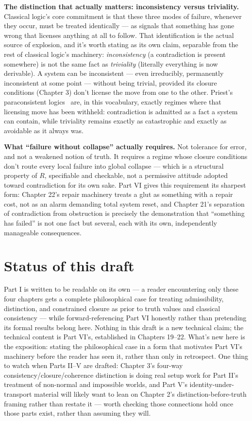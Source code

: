 \textbf{The distinction that actually matters: inconsistency versus
triviality.} Classical logic's core commitment is that these three modes
of failure, whenever they occur, must be treated identically --- as
signals that something has gone wrong that licenses anything at all to
follow. That identification is the actual source of explosion, and it's
worth stating as its own claim, separable from the rest of classical
logic's machinery: \emph{inconsistency} (a contradiction is present somewhere)
is not the same fact as \emph{triviality} (literally everything is now
derivable). A system can be inconsistent --- even irreducibly, permanently
inconsistent at some point --- without being trivial, provided its closure
conditions (Chapter 3) don't license the move from one to the other.
Priest's paraconsistent logics~\cite{priest2006} are, in this vocabulary, exactly regimes
where that licensing move has been withheld: contradiction is admitted as
a fact a system can contain, while triviality remains exactly as
catastrophic and exactly as avoidable as it always was.

\textbf{What ``failure without collapse'' actually requires.} Not tolerance for
error, and not a weakened notion of truth. It requires a regime whose
closure conditions don't route every local failure into global
collapse --- which is a structural property of \(R\), specifiable and
checkable, not a permissive attitude adopted toward contradiction for its
own sake. Part VI gives this requirement its sharpest form: Chapter 22's
repair machinery treats a glut as something with a repair cost, not as an
alarm demanding total system reset, and Chapter 21's separation of
contradiction from obstruction is precisely the demonstration that
``something has failed'' is not one fact but several, each with its own,
independently manageable consequences.

\hypertarget{status-of-this-draft}{%
\section{Status of this draft}\label{status-of-this-draft}}

Part I is written to be readable on its own --- a reader encountering only
these four chapters gets a complete philosophical case for treating
admissibility, distinction, and constrained closure as prior to truth
values and classical consistency --- while forward-referencing Part VI
honestly rather than pretending its formal results belong here. Nothing
in this draft is a new technical claim; the technical content is Part
VI's, established in Chapters 19--22. What's new here is the exposition:
stating the philosophical case in a form that motivates Part VI's
machinery before the reader has seen it, rather than only in retrospect.
One thing to watch when Parts II--V are drafted: Chapter 3's four-way
consistency/closure/coherence distinction is doing real setup work for
Part II's treatment of non-normal and impossible worlds, and Part V's
identity-under-transport material will likely want to lean on Chapter
2's distinction-before-truth framing rather than restate it --- worth
checking those connections hold once those parts exist, rather than
assuming they will.
